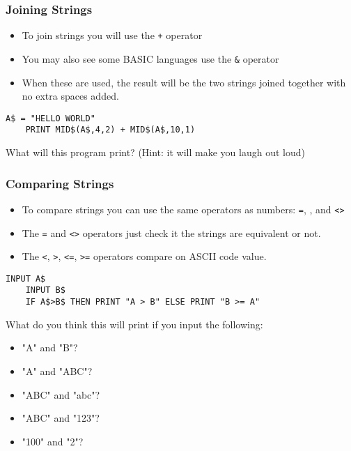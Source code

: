 \documentclass[handout,fleqn, t]{beamer}
\begin{document}
\begin{frame}[fragile]
  \frametitle{Joining Strings}
  
  \begin{itemize}
    \item To join strings you will use the \lstinline{+} operator
    \item You may also see some BASIC languages use the \lstinline{&} operator
    \item When these are used, the result will be the two strings joined together with no extra spaces added.
  \end{itemize}

  \begin{lstlisting}[gobble=4]
    A$ = "HELLO WORLD"
    PRINT MID$(A$,4,2) + MID$(A$,10,1)
  \end{lstlisting}
  
  What will this program print?  (Hint: it will make you laugh out loud)
\end{frame}

\begin{frame}[fragile]
  \frametitle{Comparing Strings}
  
  \begin{itemize}
    \item To compare strings you can use the same operators as numbers: \lstinline{=}, , and \lstinline{<>}
    \item The \lstinline{=} and \lstinline{<>} operators just check it the strings are equivalent or not.
    \item The \lstinline{<}, \lstinline{>}, \lstinline{<=}, \lstinline{>=} operators compare on ASCII code value.
  \end{itemize}

  \begin{lstlisting}[gobble=4]
    INPUT A$
    INPUT B$
    IF A$>B$ THEN PRINT "A > B" ELSE PRINT "B >= A"
  \end{lstlisting}
  
  What do you think this will print if you input the following:
  \begin{itemize}
    \item "A" and "B"?
    \item "A" and "ABC"?
    \item "ABC" and "abc"?
    \item "ABC" and "123"?
    \item "100" and "2"?
  \end{itemize}
\end{frame}
\end{document}

